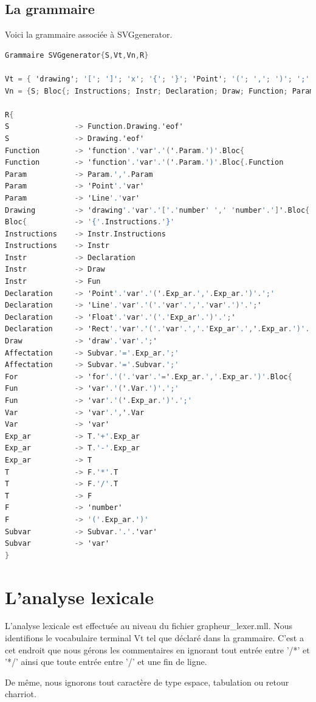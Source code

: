 \documentclass[11pt]{report} %
\begin{document}
\subsection{La grammaire}
Voici la grammaire associée à SVGgenerator.
\begin{lstlisting}[caption=Grammaire associée a SVGgenerator, language=C]
Grammaire SVGgenerator{S,Vt,Vn,R}

Vt = { 'drawing'; '['; ']'; 'x'; '{'; '}'; 'Point'; '('; ','; ')'; ';'; 'Line'; 'draw'; 'var'; 'number'; 'eof'; '+'; '-'; '/'; '*'; '.';'='; 'Rect'}
Vn = {S; Bloc{; Instructions; Instr; Declaration; Draw; Function; Param; Exp_ar; Var; T; F; Affectation; Subvar}

R{
S				-> Function.Drawing.'eof'
S				-> Drawing.'eof'
Function		-> 'function'.'var'.'('.Param.')'.Bloc{
Function		-> 'function'.'var'.'('.Param.')'.Bloc{.Function
Param			-> Param.','.Param
Param			-> 'Point'.'var'
Param			-> 'Line'.'var'
Drawing			-> 'drawing'.'var'.'['.'number' ',' 'number'.']'.Bloc{
Bloc{			-> '{'.Instructions.'}'
Instructions	-> Instr.Instructions
Instructions	-> Instr
Instr			-> Declaration
Instr			-> Draw
Instr			-> Fun
Declaration		-> 'Point'.'var'.'('.Exp_ar.','.Exp_ar.')'.';'
Declaration		-> 'Line'.'var'.'('.'var'.','.'var'.')'.';'
Declaration		-> 'Float'.'var'.'('.'Exp_ar'.')'.';'
Declaration		-> 'Rect'.'var'.'('.'var'.','.'Exp_ar'.','.Exp_ar.')'.';'
Draw			-> 'draw'.'var'.';'
Affectation		-> Subvar.'='.Exp_ar.';'
Affectation		-> Subvar.'='.Subvar.';'
For				-> 'for'.'('.'var'.'='.Exp_ar.','.Exp_ar.')'.Bloc{
Fun 			-> 'var'.'('.Var.')'.';'
Fun 			-> 'var'.'('.Exp_ar.')'.';'
Var				-> 'var'.','.Var
Var				-> 'var'
Exp_ar 			-> T.'+'.Exp_ar
Exp_ar 			-> T.'-'.Exp_ar
Exp_ar			-> T
T				-> F.'*'.T
T				-> F.'/'.T
T				-> F
F				-> 'number'
F				-> '('.Exp_ar.')'
Subvar			-> Subvar.'.'.'var'
Subvar			-> 'var'
}
\end{lstlisting}

\section{L'analyse lexicale}
	L'analyse lexicale est effectuée au niveau du fichier grapheur\_lexer.mll. Nous identifions le vocabulaire terminal Vt tel que déclaré dans la grammaire. C'est a cet endroit que nous gérons les commentaires en ignorant tout entrée entre '/*' et '*/' ainsi que toute entrée entre '/' et une fin de ligne.

De même, nous ignorons tout caractère de type espace, tabulation ou retour charriot.
\end{document}

